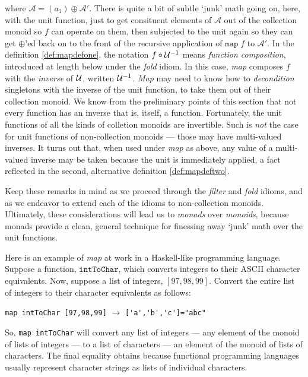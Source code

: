 where $\mathcal{A}=(a_1)\oplus\mathcal{A}'$. There is quite a bit of subtle `junk' math going on, here, with the unit function, just to get consituent elements of $\mathcal{A}$ out of the collection monoid so $f$ can operate on them, then subjected to the unit again so they can get $\oplus$'ed back on to the front of the recursive application of $\mathtt{map}\;f$ to $\mathcal{A}'$. In the definition \ref{def:mapdefone}, the notation $f\circ\mathcal{U}^{-1}$ means \emph{function composition}, introduced at length below under the \emph{fold} idiom. In this case, \emph{map} composes $f$ with the \emph{inverse} of $\mathcal{U}$, written $\mathcal{U}^{-1}$. \emph{Map} may need to know how to \emph{decondition} singletons with the inverse of the unit function, to take them out of their collection monoid. We know from the preliminary points of this section that not every function has an inverse that is, itself, a function. Fortunately, the unit functions of all the kinds of colletion monoids are invertible. Such is \emph{not} the case for unit functions of non-collection monoids --- those may have multi-valued inverses. It turns out that, when used under \emph{map} as above, any value of a multi-valued inverse may be taken because the unit is immediately applied, a fact reflected in the second, alternative definition \ref{def:mapdeftwo}.


Keep these remarks in mind as we proceed through the \emph{filter} and \emph{fold} idioms, and as we endeavor to extend each of the idioms to non-collection monoids. Ultimately, these considerations will lead us to \emph{monads} over \emph{monoids}, because monads provide a clean, general technique for finessing away `junk' math over the unit functions.


Here is an example of \emph{map} at work in a Haskell-like programming language. Suppose a function, $\mathtt{intToChar}$, which converts integers to their ASCII character equivalents. Now, suppose a list of integers, $[97, 98, 99]$. Convert the entire list of integers to their character equivalents as follows:
\begin{center}
  \verb"map intToChar [97,98,99]" $\rightarrow$ \verb$['a','b','c']="abc"$
\end{center}
So, \verb"map intToChar" will convert any list of integers --- any element of the monoid of lists of integers --- to a list of characters --- an element of the monoid of lists of characters. The final equality obtains because functional programming languages usually represent character strings as lists of individual characters.


